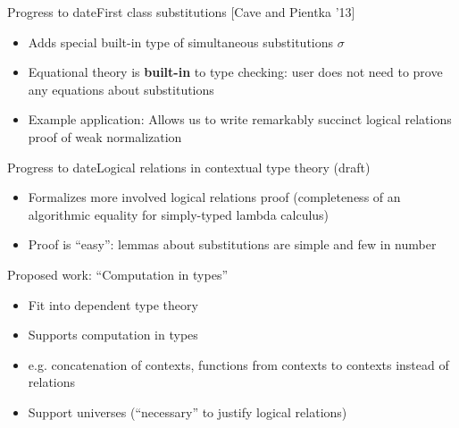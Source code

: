 \documentclass[usenames,dvipsnames]{beamer}
\begin{document}
\begin{frame}{Progress to date}{First class substitutions [Cave and Pientka '13]}
\begin{itemize}
\item Adds special built-in type of simultaneous substitutions $\sigma$
\item Equational theory is \textbf{built-in} to type checking: user does not need to prove any equations about substitutions
\item Example application: Allows us to write remarkably succinct logical relations proof of weak normalization
\end{itemize}
\end{frame}

\begin{frame}{Progress to date}{Logical relations in contextual type theory (draft)}
\begin{itemize}
\item Formalizes more involved logical relations proof (completeness of an algorithmic equality for simply-typed lambda calculus)
\item Proof is ``easy'': lemmas about substitutions are simple and few in number
\end{itemize}
\end{frame}


\begin{frame}{Proposed work: ``Computation in types''}
\begin{itemize}
\item Fit into dependent type theory
\item Supports computation in types
\item e.g. concatenation of contexts, functions from contexts to contexts instead of relations
\item Support universes (``necessary'' to justify logical relations)
\end{itemize}
\end{frame}
\end{document}
